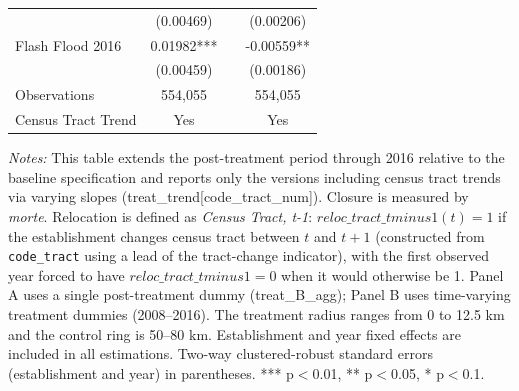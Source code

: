 \begin{supptable}[H]
{\begin{threeparttable}
\begin{tabular}{lccc}
                      & (0.00469) &       & (0.00206)\\
    Flash Flood 2016 & 0.01982*** &       & -0.00559**\\
                      & (0.00459) &       & (0.00186)\\
    Observations & 554{,}055 &       & 554{,}055\\
    Census Tract Trend & Yes &       & Yes\\
    \bottomrule
    \end{tabular}%
   	\begin{tablenotes}[flushleft] \item \small \textit{Notes:} This table extends the post-treatment period through 2016 relative to the baseline specification and reports only the versions including census tract trends via varying slopes (treat\_trend[code\_tract\_num]). Closure is measured by \textit{morte}. Relocation is defined as \textit{Census Tract, t-1}: $reloc\_tract\_tminus1(t)=1$ if the establishment changes census tract between $t$ and $t+1$ (constructed from \texttt{code\_tract} using a lead of the tract-change indicator), with the first observed year forced to have $reloc\_tract\_tminus1=0$ when it would otherwise be 1. Panel A uses a single post-treatment dummy (treat\_B\_agg); Panel B uses time-varying treatment dummies (2008--2016). The treatment radius ranges from 0 to 12.5 km and the control ring is 50--80 km. Establishment and year fixed effects are included in all estimations. Two-way clustered-robust standard errors (establishment and year) in parentheses. *** p$<$0.01, ** p$<$0.05, * p$<$0.1.
   	\end{tablenotes}
   	\end{threeparttable}
   	}
\end{supptable}%
